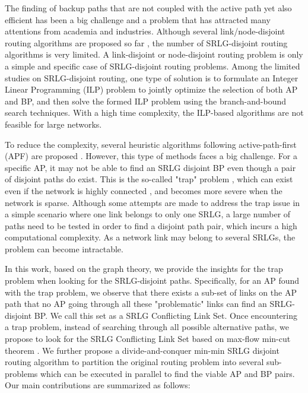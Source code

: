 The finding of backup paths that are not coupled with the active path yet also efficient has been a big challenge and a problem that has attracted many attentions from academia and industries. Although several link/node-disjoint routing algorithms are proposed so far \cite{suurballe1984quick,bhandari1997optimal,li1990complexity,guo2003link,xu2004finding,beshir2011variants,guo2013finding,hu2003diverse}, the number of SRLG-disjoint routing algorithms is very limited.  A link-disjoint or node-disjoint routing problem is only a simple and specific case of SRLG-disjoint routing problems. Among the limited studies on SRLG-disjoint routing, one type of solution is to formulate an Integer Linear Programming (ILP) \cite{hu2003diverse} problem to jointly optimize the selection of both AP and BP, and then solve the formed ILP problem using the branch-and-bound \cite{lawler1966branch} search techniques. With a high time complexity, the ILP-based algorithms are not feasible for large networks.

To reduce the complexity, several heuristic algorithms following active-path-first (APF) are proposed \cite{oki2002disjoint,li2002fiber,eppstein1998finding}. However, this type of methods faces a big challenge. For a specific AP, it may not be able to find an SRLG disjoint BP even though a pair of disjoint paths do exist. This is the so-called "trap" problem \cite{dunn1994comparison}, which can exist even if the network is highly connected \cite{laborczi2001solving}, and becomes more severe when the network is sparse. Although some attempts are made to address the trap issue in a simple scenario where  one link belongs to only one SRLG,  a large number of paths need to be tested in order to find a disjoint path pair, which incurs a high computational complexity. As a network link may belong to several SRLGs, the problem can become intractable.

In this work, based on the graph theory, we provide the insights for the trap problem when looking for the SRLG-disjoint paths. Specifically, for an AP found with the trap problem, we observe that there exists a sub-set of links on the AP path that no AP going through all these "problematic" links can find an SRLG-disjoint BP. We call this set as a SRLG Conflicting Link Set. Once encountering a trap problem, instead of searching through all possible alternative paths, we propose to look for the SRLG Conflicting Link Set based on max-flow min-cut theorem \cite{ford2015flows}. We further propose a divide-and-conquer min-min SRLG disjoint routing algorithm to partition the original routing problem into several sub-problems which can be executed in parallel to find the viable AP and BP pairs. Our main contributions are summarized as follows:


